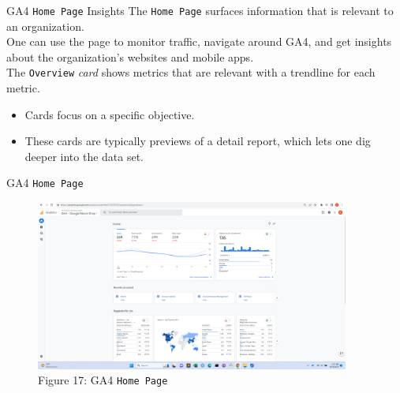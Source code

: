 \documentclass[pdf]{beamer}
\theoremstyle{remark}
\theoremstyle{definition}
\begin{document}
\begin{frame}[t]{GA4 \texttt{Home Page} Insights}
The \texttt{Home Page} surfaces information that is relevant to an organization. \\
\vspace{1.5ex}
One can use the page to monitor traffic, navigate around GA4, and get insights about the organization's websites and mobile apps. \\
\vspace{1.5ex}
The \texttt{Overview} \textit{card} shows metrics that are relevant with a trendline for each metric. \\
\small
\begin{itemize}
\item Cards focus on a specific objective. 
\item These cards are typically previews of a detail report, which lets one dig deeper into the data set. 
\end{itemize} 
\end{frame}

\begin{frame}[t]{GA4 \texttt{Home Page}}
\begin{figure}[htbp]
  \captionsetup{justification=centering}
  \includegraphics[height=5.6cm, trim=1.5cm 0.0cm 2.0cm 0.0cm width=5.6cm]{Images/G4A_6a_091923_Homepage_and_Search_Bar.png}
  \caption{Figure {\color{franklinblue} 17}: GA4 \texttt{Home Page}}
\end{figure}
\end{frame}
\end{document}
